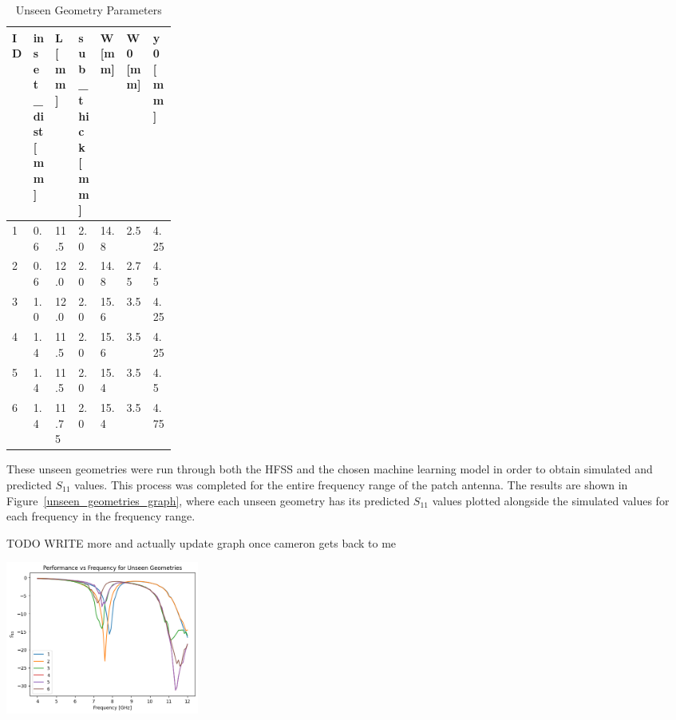 \documentclass[lettersize,journal]{IEEEtran}
\newenvironment{Figure}
    {\par\medskip\noindent\minipage{\linewidth}}
    {\endminipage\par\medskip}
\begin{document}
\begin{table}[h]
\caption{Unseen Geometry Parameters}
\begin{center}
\begin{tabular}{ |l|p{0.12\linewidth}|l|p{0.12\linewidth}|l|l|l| }
    \hline
    ID & inset\_dist [mm] & L [mm] & sub\_thick [mm] & W [mm] & W0 [mm] & y0 [mm] \\ 
    \hline
    1 & 0.6 & 11.5 & 2.0 & 14.8 & 2.5 & 4.25 \\
    \hline
    2 & 0.6 & 12.0 & 2.0 & 14.8 & 2.75 & 4.5 \\
    \hline
    3 & 1.0 & 12.0 & 2.0 & 15.6 & 3.5 & 4.25 \\
    \hline
    4 & 1.4 & 11.5 & 2.0 & 15.6 & 3.5 & 4.25 \\
    \hline
    5 & 1.4 & 11.5 & 2.0 & 15.4 & 3.5 & 4.5 \\
    \hline
    6 & 1.4 & 11.75 & 2.0 & 15.4 & 3.5 & 4.75 \\
    \hline
\end{tabular}
\end{center}
\label{unseen_geometries}
\end{table}

These unseen geometries were run through both the HFSS and the chosen machine learning model in order to obtain simulated and predicted $S_{11}$ values. This process was completed for the entire frequency range of the patch antenna. The results are shown in Figure~\ref{unseen_geometries_graph}, where each unseen geometry has its predicted $S_{11}$ values plotted alongside the simulated values for each frequency in the frequency range.

TODO WRITE more and actually update graph once cameron gets back to me 

\begin{Figure}
    \centering
    \includegraphics[width=2.5in]{unseen_geometries_freq_vs_seq}
    \label{unseen_geometries_graph}
\end{Figure}
\end{document}

